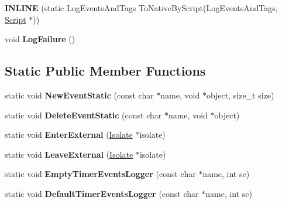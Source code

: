 \begin{DoxyCompactItemize}
\item 
\hypertarget{classv8_1_1internal_1_1_logger_a9bc9413ee8b19b6557f476b0e8ee8ea5}{}{\bfseries I\+N\+L\+I\+N\+E} (static Log\+Events\+And\+Tags To\+Native\+By\+Script(Log\+Events\+And\+Tags, \hyperlink{classv8_1_1internal_1_1_script}{Script} $\ast$))\label{classv8_1_1internal_1_1_logger_a9bc9413ee8b19b6557f476b0e8ee8ea5}

\item 
\hypertarget{classv8_1_1internal_1_1_logger_ab5fc1e0f322695f69c7a6bcee79ceaa5}{}void {\bfseries Log\+Failure} ()\label{classv8_1_1internal_1_1_logger_ab5fc1e0f322695f69c7a6bcee79ceaa5}

\end{DoxyCompactItemize}
\subsection*{Static Public Member Functions}
\begin{DoxyCompactItemize}
\item 
\hypertarget{classv8_1_1internal_1_1_logger_a9cd04653d46afe7c672dcbc09551a211}{}static void {\bfseries New\+Event\+Static} (const char $\ast$name, void $\ast$object, size\+\_\+t size)\label{classv8_1_1internal_1_1_logger_a9cd04653d46afe7c672dcbc09551a211}

\item 
\hypertarget{classv8_1_1internal_1_1_logger_a207522991fad24b38c44c42dfb51e554}{}static void {\bfseries Delete\+Event\+Static} (const char $\ast$name, void $\ast$object)\label{classv8_1_1internal_1_1_logger_a207522991fad24b38c44c42dfb51e554}

\item 
\hypertarget{classv8_1_1internal_1_1_logger_a89b6f2b7d49bb9d19dc26909aee24e65}{}static void {\bfseries Enter\+External} (\hyperlink{classv8_1_1internal_1_1_isolate}{Isolate} $\ast$isolate)\label{classv8_1_1internal_1_1_logger_a89b6f2b7d49bb9d19dc26909aee24e65}

\item 
\hypertarget{classv8_1_1internal_1_1_logger_a66eff83e012fb21ad8f2c9b41fcb6aaf}{}static void {\bfseries Leave\+External} (\hyperlink{classv8_1_1internal_1_1_isolate}{Isolate} $\ast$isolate)\label{classv8_1_1internal_1_1_logger_a66eff83e012fb21ad8f2c9b41fcb6aaf}

\item 
\hypertarget{classv8_1_1internal_1_1_logger_a22c1c9d830d6e4aecfa2734913583b3e}{}static void {\bfseries Empty\+Timer\+Events\+Logger} (const char $\ast$name, int se)\label{classv8_1_1internal_1_1_logger_a22c1c9d830d6e4aecfa2734913583b3e}

\item 
\hypertarget{classv8_1_1internal_1_1_logger_a693a2d8df24080bc0af30244b036b583}{}static void {\bfseries Default\+Timer\+Events\+Logger} (const char $\ast$name, int se)\label{classv8_1_1internal_1_1_logger_a693a2d8df24080bc0af30244b036b583}

\end{DoxyCompactItemize}
